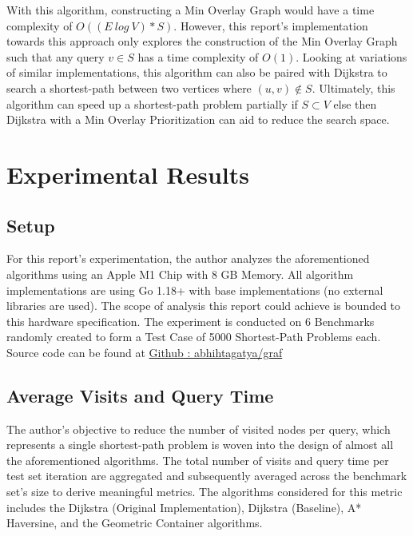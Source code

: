 \documentclass{article}
\begin{document}
With this algorithm, constructing a Min Overlay Graph would have a time complexity of $O((E \ log \ V) * S)$. However, this report's implementation towards this approach only explores the construction of the Min Overlay Graph such that any query $v \in S$ has a time complexity of $O(1)$. Looking at variations of similar implementations, this algorithm can also be paired with Dijkstra to search a shortest-path between two vertices where $(u,v) \notin S$. Ultimately, this algorithm can speed up a shortest-path problem partially if $S \subset V$ else then Dijkstra with a Min Overlay Prioritization can aid to reduce the search space.

\section{Experimental Results}

\subsection{Setup}

For this report's experimentation, the author analyzes the aforementioned algorithms using an Apple M1 Chip with 8 GB Memory. All algorithm implementations are using Go 1.18+ with base implementations (no external libraries are used). The scope of analysis this report could achieve is bounded to this hardware specification. The experiment is conducted on 6 Benchmarks randomly created to form a Test Case of 5000 Shortest-Path Problems each. Source code can be found at \href{https://github.com/abhishtagatya/graf}{Github : abhihtagatya/graf}

\subsection{Average Visits and Query Time}

The author's objective to reduce the number of visited nodes per query, which represents a single shortest-path problem is woven into the design of almost all the aforementioned algorithms. The total number of visits and query time per test set iteration are aggregated and subsequently averaged across the benchmark set's size to derive meaningful metrics. The algorithms considered for this metric includes the Dijkstra (Original Implementation), Dijkstra (Baseline), A* Haversine, and the Geometric Container algorithms.
\end{document}
